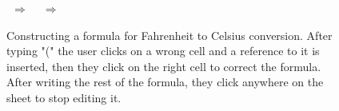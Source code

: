 \begin{figure}

$~~\boldsymbol{\Rightarrow}~~$
$~~\boldsymbol{\Rightarrow}~~$
\caption{Constructing a formula for Fahrenheit to Celsius conversion. 
After typing "(" the user clicks on a wrong cell and a reference to it is inserted,
 then they click on the right cell to correct the formula.  After
writing the rest of the formula, they click anywhere on the sheet to stop editing it.}
\label{fig:holes}
\end{figure}

\newcommand{\hhole}[1]{{\color{Purple}{\llparenthesis}} \hspace{0.05em} #1 \hspace{0.05em} {\color{Purple}{\rrparenthesis}}}
\newcommand{\errrec}[1]{{\color{Emerald} #1}}
\newcommand{\hcmt}[1]{\text{\color{gray}\small #1}}

